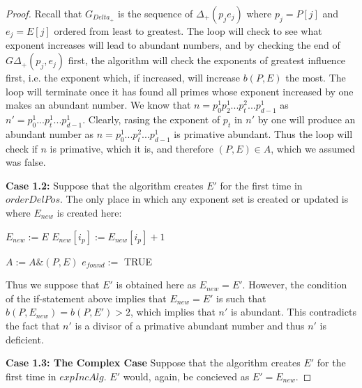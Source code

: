 \documentclass[../paper.tex]{subfiles}
\begin{document}
\begin{proof}
  Recall that $G_{Delta_+}$ is the sequence of $\Delta_+(p_j e_j)$
where $p_j = P[j]$ and $e_j = E[j]$ ordered from least to greatest.
The loop will check to see what exponent increases will lead to
abundant numbers, and by checking the end of $G\Delta_+(p_j, e_j)$
first, the algorithm will check the exponents of greatest
influence first, i.e. the exponent which, if increased, will
increase $b(P,E)$ the most. The loop will terminate once it
has found all primes whose exponent increased by one makes an
abundant number. We know that $n = p_0^1 p_2^1 ... p_t^2...
p_{d-1}^1$ as $n' = p_0^1 ... p_t^1 ... p_{d-1}^1$.
 Clearly, rasing the exponent of $p_t$ in $n'$ by one will
produce an abundant number as $n = p_0^{1} ... p_t^{2} ...
p_{d-1}^1$ is primative abundant. Thus the loop will check if $n$
is primative, which it is, and therefore $(P,E) \in A$, which we
assumed was false.

\textbf{Case 1.2:}
  Suppose that the algorithm creates $E'$ for the first time in
$orderDelPos$. The only place in which any exponent set is created
or updated is where $E_{new}$ is created here:
\begin{algorithmic}
 
		\STATE $E_{new} := E$
		\STATE $E_{new}[ i_p ] := E_{new}[ i_p ] + 1 $
		
			\STATE $A := A\&(P,E)$
			\STATE $e_{found} := $ TRUE
		\ENDIF 

  \ENDIF
\end{algorithmic}
  Thus we suppose that $E'$ is obtained here as $E_{new} = E'$.
However, the condition of the if-statement above implies that
$E_{new} = E'$ is such that $b(P,E_{new}) = b(P,E') > 2$, which
implies that $n'$ is abundant. This contradicts the fact that $n'$
is a divisor of a primative abundant number and thus $n'$ is
deficient.   

\textbf{Case 1.3: The Complex Case}
  Suppose that the algorithm creates $E'$ for the first time in
$expIncAlg$. $E'$ would, again, be concieved as $E' = E_{new}$. 

%



\end{proof}
\end{document}
